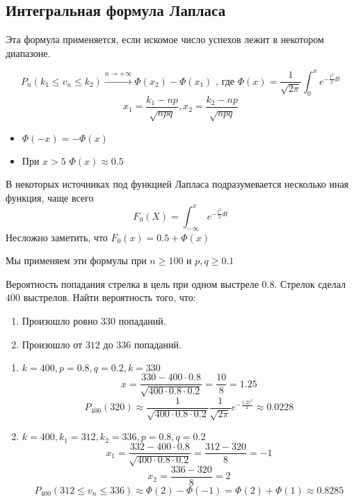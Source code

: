 \documentclass[12pt, a4paper, oneside]{book}
\begin{document}
\subsection{Интегральная формула Лапласа}

\begin{remark}
    Эта формула применяется, если искомое число успехов лежит в некотором диапазоне.
\end{remark}

\[P_n(k_1 \leq v_n \leq k_2) \xrightarrow{n \to +\infty} \Phi(x_2) - \Phi(x_1) \text{ , где } \Phi(x) = \frac{1}{\sqrt{2\pi}} \int_0^x e^{- \frac{t^2}{2}dt}\]
\[x_1 = \frac{k_1 - np}{\sqrt{npq}}, x_2 = \frac{k_2 - np}{\sqrt{npq}}\]

\begin{prop}\itemfix
    \begin{itemize}
        \item \(\Phi( - x) = -\Phi(x)\)
        \item При \( x > 5\) \(\Phi(x) \approx 0.5\)
    \end{itemize}
\end{prop}

\begin{remark}
    В некоторых источниках под функцией Лапласа подразумевается несколько иная функция, чаще всего
    \[F_0(X) = \int_{ -\infty}^x e^{- \frac{t^2}{2}dt}\]
    Несложно заметить, что \(F_0(x) = 0.5 + \Phi(x)\)
\end{remark}

Мы применяем эти формулы при \(n \geq 100\) и \(p, q \geq 0.1\)

\begin{example}
    Вероятность попадания стрелка в цель при одном выстреле \(0.8\). Стрелок сделал \(400\) выстрелов. Найти вероятность того, что:
    \begin{enumerate}
        \item Произошло ровно \(330\) попаданий.
        \item Произошло от \(312\) до \(336\) попаданий.
    \end{enumerate}

    \begin{enumerate}
        \item \(k = 400, p = 0.8, q = 0.2, k = 330\)
              \[x = \frac{330 - 400\cdot 0.8}{\sqrt{400\cdot 0.8\cdot 0.2}} = \frac{10}{8} = 1.25\]
              \[P_{400}(320) \approx \frac{1}{\sqrt{400\cdot 0.8\cdot 0.2}} \frac{1}{\sqrt{2\pi}}e^{ - \frac{1.25^2}{2}} \approx 0.0228\]

        \item \(k = 400, k_1 = 312, k_2 = 336, p = 0.8, q = 0.2\)
              \[x_1 = \frac{332 - 400\cdot 0.8}{\sqrt{400\cdot 0.8\cdot 0.2}} = \frac{312 - 320}{8} =- 1\]
              \[x_2 = \frac{336 - 320}{8} = 2\]
              \[P_{400}(312 \leq v_n \leq 336) \approx \Phi(2) - \Phi( - 1) = \Phi(2) + \Phi(1) \approx 0.8285\]
    \end{enumerate}
\end{example}
\end{document}
